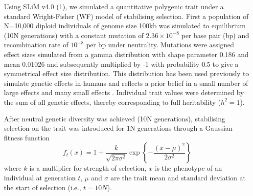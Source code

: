 \documentclass[12pt]{zHenriquesLab-StyleBioRxiv}
\begin{document}
{{Using SLiM v4.0 (1), we simulated a quantitative polygenic trait under
a standard Wright-Fisher (WF) model of stabilising selection. First a
population of N=10,000 diploid individuals of genome size 100kb was simulated to
equilibrium (10N generations) with a constant mutation of
$2.36\times 10^{-8}$ per base pair (bp) and recombination rate of
$10^{-8}$ per bp under neutrality. Mutations were assigned effect
sizes simulated from a gamma distribution with shape parameter 0.186
and mean 0.01026 and subsequently multiplied by -1 with probability
0.5 to give a symmetrical effect size distribution. This distribution
has been used previously to simulate genetic effects in humans and
reflects a prior belief in a small number of large effects and many
small effects \cite{anil3}. Individual trait values were determined by
the sum of all genetic effects, thereby corresponding to full heritability ($h^2 =1$).

After neutral genetic diversity was achieved (10N generations),
stabilising selection on the trait was introduced for 1N
generations through a Gaussian fitness function
\begin{equation} 
  f_t(x) = 1 + \frac{k}{\sqrt{2\pi\sigma^2}} \exp\left\{-\frac{(x-\mu)^2}{2\sigma^2}\right\}
\end{equation}
where $k$ is a multiplier for strength of selection,
$x$ is the phenotype of an individual at generation $t$, $\mu$
and $\sigma$ are the trait mean and standard deviation at the start of
selection (i.e., $t=10N$).

}}
\end{document}
